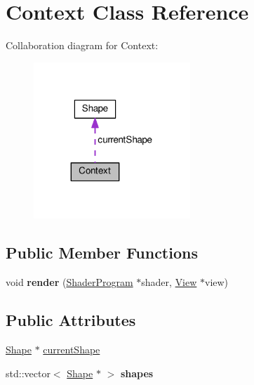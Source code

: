 \hypertarget{classContext}{}\section{Context Class Reference}
\label{classContext}


Collaboration diagram for Context\+:
\nopagebreak
\begin{figure}[H]
\begin{center}
\leavevmode
\includegraphics[width=167pt]{classContext__coll__graph}
\end{center}
\end{figure}
\subsection*{Public Member Functions}
\begin{DoxyCompactItemize}
\item 
\hypertarget{classContext_a30f4ecb566d47094a9292e33d7c19331}{}void {\bfseries render} (\hyperlink{classShaderProgram}{Shader\+Program} $\ast$shader, \hyperlink{classView}{View} $\ast$view)\label{classContext_a30f4ecb566d47094a9292e33d7c19331}

\end{DoxyCompactItemize}
\subsection*{Public Attributes}
\begin{DoxyCompactItemize}
\item 
\hyperlink{classShape}{Shape} $\ast$ \hyperlink{classContext_a8c5402128ba3105635ac7d14353d934a}{current\+Shape}
\item 
\hypertarget{classContext_a7b52a567fdb294c04d208ad46646bd1c}{}std\+::vector$<$ \hyperlink{classShape}{Shape} $\ast$ $>$ {\bfseries shapes}\label{classContext_a7b52a567fdb294c04d208ad46646bd1c}

\end{DoxyCompactItemize}


